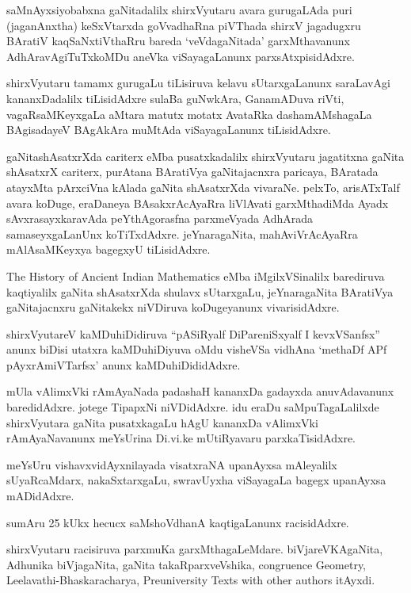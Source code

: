 saMnAyxsiyobabxna gaNitadalilx shirxVyutaru avara gurugaLAda puri (jaganAnxtha) keSxVtarxda goVvadhaRna piVThada shirxV jagadugxru BAratiV kaqSaNxtiVthaRru bareda `veVdagaNitada' garxMthavanunx AdhAravAgiTuTxkoMDu aneVka viSayagaLanunx parxsAtxpisidAdxre.

shirxVyutaru tamamx gurugaLu tiLisiruva kelavu sUtarxgaLanunx saraLavAgi kananxDadalilx tiLisidAdxre sulaBa guNwkAra, GanamADuva riVti, vagaRsaMKeyxgaLa aMtara matutx motatx AvataRka dashamAMshagaLa BAgisadayeV BAgAkAra muMtAda viSayagaLanunx tiLisidAdxre.

gaNitashAsatxrXda cariterx eMba pusatxkadalilx shirxVyutaru jagatitxna gaNita shAsatxrX cariterx, purAtana BAratiVya gaNitajacnxra paricaya, BAratada atayxMta pArxciVna kAlada gaNita shAsatxrXda vivaraNe. pelxTo, arisATxTalf avara koDuge, eraDaneya BAsakxrAcAyaRra liVlAvati garxMthadiMda Ayadx sAvxrasayxkaravAda peYthAgorasfna parxmeVyada AdhArada samaseyxgaLanUnx koTiTxdAdxre. jeYnaragaNita, mahAviVrAcAyaRra mAlAsaMKeyxya bagegxyU tiLisidAdxre.

{\rm The History of Ancient Indian Mathematics} eMba iMgilxVSinalilx barediruva kaqtiyalilx gaNita shAsatxrXda shulavx sUtarxgaLu, jeYnaragaNita BAratiVya gaNitajacnxru gaNitakekx niVDiruva koDugeyanunx vivarisidAdxre.

shirxVyutareV kaMDuhiDidiruva ``pASiRyalf DiPareniSxyalf I kevxVSanfsx'' anunx biDisi utatxra kaMDuhiDiyuva oMdu visheVSa vidhAna `methaDf APf pAyxrAmiVTarfsx' anunx kaMDuhiDididAdxre.

mUla vAlimxVki rAmAyaNada padashaH kananxDa gadayxda anuvAdavanunx baredidAdxre. jotege TipapxNi niVDidAdxre. idu eraDu saMpuTagaLalilxde shirxVyutara gaNita pusatxkagaLu hAgU kananxDa vAlimxVki rAmAyaNavanunx meYsUrina Di.vi.ke mUtiRyavaru parxkaTisidAdxre.

meYsUru vishavxvidAyxnilayada visatxraNA upanAyxsa mAleyalilx sUyaRcaMdarx, nakaSxtarxgaLu, swravUyxha viSayagaLa bagegx upanAyxsa mADidAdxre.

sumAru {\rm 25} kUkx hecucx saMshoVdhanA kaqtigaLanunx racisidAdxre.

shirxVyutaru racisiruva parxmuKa garxMthagaLeMdare. biVjareVKAgaNita, Adhunika biVjagaNita, gaNita takaRparxveVshika, {\rm congruence Geometry, Leelavathi-Bhaskaracharya, Preuniversity Texts with other authors} itAyxdi.
